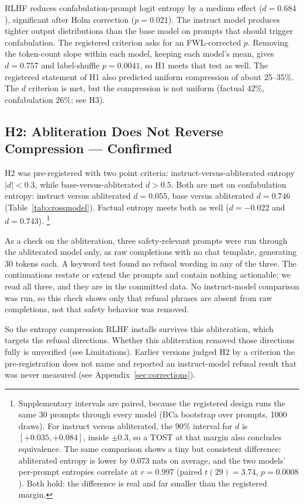 \documentclass[11pt,a4paper]{article}
\begin{document}
RLHF reduces confabulation-prompt logit entropy by a medium effect
($d{=}0.684$), significant after Holm correction ($p{=}0.021$). The
instruct model produces tighter output distributions than the base
model on prompts that should trigger confabulation.
The registered criterion asks for an FWL-corrected $p$. Removing the
token-count slope within each model, keeping each model's mean, gives
$d = 0.757$ and label-shuffle $p = 0.0041$, so H1 meets that test as
well. The registered statement of H1 also predicted uniform
compression of about 25--35\%. The $d$ criterion is met, but the
compression is not uniform (factual $42\%$, confabulation $26\%$;
see H3).

\subsection{H2: Abliteration Does Not Reverse Compression --- Confirmed}

H2 was pre-registered with two point criteria: instruct-versus-abliterated
entropy $|d| < 0.3$, while base-versus-abliterated $d > 0.5$. Both are
met on confabulation entropy: instruct versus abliterated $d = 0.055$,
base versus abliterated $d = 0.746$ (Table~\ref{tab:crossmodel}).
Factual entropy meets both as well ($d = -0.022$ and $d = 0.743$).%
\footnote{Supplementary intervals are paired, because the registered
design runs the same 30 prompts through every model (BCa bootstrap
over prompts, 1000 draws). For instruct versus abliterated, the 90\%
interval for $d$ is $[+0.035, +0.084]$, inside $\pm 0.3$, so a TOST
at that margin also concludes equivalence. The same comparison shows a
tiny but consistent difference: abliterated entropy is lower by 0.073
nats on average, and the two models' per-prompt entropies correlate at
$r = 0.997$ (paired $t(29) = 3.74$, $p = 0.0008$). Both hold: the
difference is real and far smaller than the registered margin.}

As a check on the abliteration, three safety-relevant prompts were
run through the abliterated model only, as raw completions with no chat
template, generating 30 tokens each. A keyword test found no refusal
wording in any of the three. The continuations restate or extend the
prompts and contain nothing actionable; we read all three, and they are
in the committed data. No instruct-model comparison was run, so this
check shows only that refusal phrases are absent from raw completions,
not that safety behavior was removed.

So the entropy compression RLHF installs survives this abliteration,
which targets the refusal directions. Whether this abliteration removed
those directions fully is unverified (see Limitations).
Earlier versions judged H2 by a criterion the pre-registration does
not name and reported an instruct-model refusal result that was never
measured (see Appendix~\ref{sec:corrections}).
\end{document}
